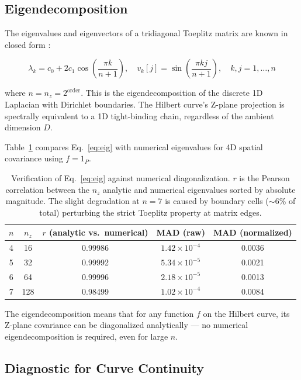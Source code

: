 \documentclass[11pt,a4paper]{article}
\begin{document}
\subsection{Eigendecomposition}

The eigenvalues and eigenvectors of a tridiagonal Toeplitz matrix are
known in closed form \cite{grenander1958, kulkarni1999}:

\begin{equation}
\lambda_k = c_0 + 2c_1\cos\left(\frac{\pi k}{n+1}\right), \quad
v_k[j] = \sin\left(\frac{\pi k j}{n+1}\right), \quad k,j = 1,\ldots,n
\label{eq:eig}
\end{equation}

where $n = n_z = 2^{\text{order}}$. This is the eigendecomposition of the
discrete 1D Laplacian with Dirichlet boundaries. The Hilbert curve's
Z-plane projection is spectrally equivalent to a 1D tight-binding chain,
regardless of the ambient dimension $D$.

Table~\ref{tab:verify} compares Eq.~\ref{eq:eig} with numerical eigenvalues
for 4D spatial covariance using $f = 1_P$.

\begin{table}[h]
\centering
\begin{tabular}{ccccc}
\toprule
$n$ & $n_z$ & $r$ (analytic vs.\ numerical) & MAD (raw) & MAD (normalized) \\
\midrule
4 & 16   & 0.99986 & $1.42 \times 10^{-4}$ & 0.0036 \\
5 & 32   & 0.99992 & $5.34 \times 10^{-5}$ & 0.0021 \\
6 & 64   & 0.99996 & $2.18 \times 10^{-5}$ & 0.0013 \\
7 & 128  & 0.98499 & $1.02 \times 10^{-4}$ & 0.0084 \\
\bottomrule
\end{tabular}
\caption{Verification of Eq.~\ref{eq:eig} against numerical diagonalization.
$r$ is the Pearson correlation between the $n_z$ analytic and numerical
eigenvalues sorted by absolute magnitude. The slight degradation at $n=7$
is caused by boundary cells ($\sim$6\% of total) perturbing the strict
Toeplitz property at matrix edges.}
\label{tab:verify}
\end{table}

The eigendecomposition means that for any function $f$ on the Hilbert
curve, its Z-plane covariance can be diagonalized analytically --- no
numerical eigendecomposition is required, even for large $n$.

\subsection{Diagnostic for Curve Continuity}
\end{document}
